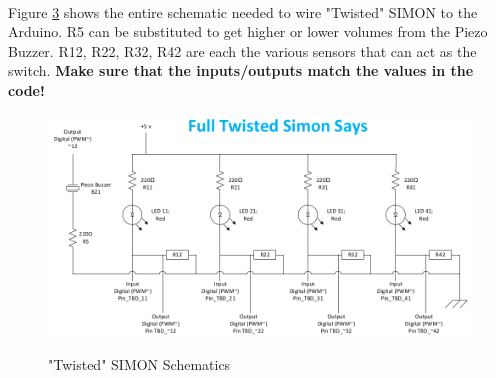 \documentclass[12pt,letterpaper,oneside]{article}
\begin{document}
\begin{figure}[here]
\begin{subfigure}[b]{0.4\textwidth}
                \label{fig:sens4}
	        \end{subfigure}
		\end{figure}
\\Figure \ref{fig:schem3} shows the entire schematic needed to wire "Twisted" SIMON to the Arduino. R5 can be substituted to get higher or lower volumes from the Piezo Buzzer. R12, R22, R32, R42 are each the various sensors that can act as the switch. \textbf{Make sure that the inputs/outputs match the values in the code!}
			\begin{figure} [h!]
				\centering
				\caption{"Twisted" SIMON Schematics}
				\includegraphics[scale=.5]{images/circuit_6.png}		
				\label{fig:schem3}
			\end{figure}	
	
\end{document}
